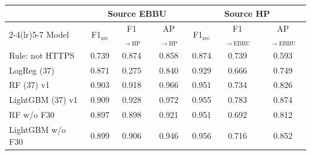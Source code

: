 \begin{tabular}{lcccccc}
\toprule
& \multicolumn{3}{c}{Source EBBU} & \multicolumn{3}{c}{Source HP} \\
\cmidrule(lr){2-4}\cmidrule(lr){5-7}
Model & F1$_{\mathrm{src}}$ & F1$_{\rightarrow\mathrm{HP}}$ & AP$_{\rightarrow\mathrm{HP}}$ & F1$_{\mathrm{src}}$ & F1$_{\rightarrow\mathrm{EBBU}}$ & AP$_{\rightarrow\mathrm{EBBU}}$ \\
\midrule
Rule: not HTTPS & 0.739 & 0.874 & 0.858 & 0.874 & 0.739 & 0.593 \\
\midrule
LogReg (37) & 0.871 & 0.275 & 0.840 & 0.929 & 0.666 & 0.749 \\
RF (37) v1 & 0.903 & 0.918 & 0.966 & 0.951 & 0.734 & 0.826 \\
LightGBM (37) v1 & 0.909 & 0.928 & 0.972 & 0.955 & 0.783 & 0.874 \\
RF w/o F30 & 0.897 & 0.898 & 0.921 & 0.951 & 0.692 & 0.812 \\
LightGBM w/o F30 & 0.899 & 0.906 & 0.946 & 0.956 & 0.716 & 0.852 \\
\bottomrule
\end{tabular}
